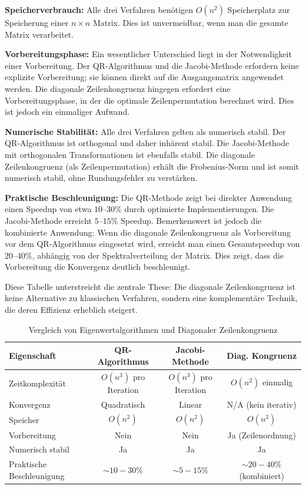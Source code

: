 \documentclass[a4paper,12pt]{article}
\theoremstyle{definition}
\begin{document}
\textbf{Speicherverbrauch:} Alle drei Verfahren benötigen $O(n^2)$ Speicherplatz zur Speicherung einer $n \times n$ Matrix. Dies ist unvermeidbar, wenn man die gesamte Matrix verarbeitet.

\textbf{Vorbereitungsphase:} Ein wesentlicher Unterschied liegt in der Notwendigkeit einer Vorbereitung. Der QR-Algorithmus und die Jacobi-Methode erfordern keine explizite Vorbereitung; sie können direkt auf die Ausgangsmatrix angewendet werden. Die diagonale Zeilenkongruenz hingegen erfordert eine Vorbereitungsphase, in der die optimale Zeilenpermutation berechnet wird. Dies ist jedoch ein einmaliger Aufwand.

\textbf{Numerische Stabilität:} Alle drei Verfahren gelten als numerisch stabil. Der QR-Algorithmus ist orthogonal und daher inhärent stabil. Die Jacobi-Methode mit orthogonalen Transformationen ist ebenfalls stabil. Die diagonale Zeilenkongruenz (als Zeilenpermutation) erhält die Frobenius-Norm und ist somit numerisch stabil, ohne Rundungsfehler zu verstärken.

\textbf{Praktische Beschleunigung:} Die QR-Methode zeigt bei direkter Anwendung einen Speedup von etwa $10$–$30\%$ durch optimierte Implementierungen. Die Jacobi-Methode erreicht $5$–$15\%$ Speedup. Bemerkenswert ist jedoch die kombinierte Anwendung: Wenn die diagonale Zeilenkongruenz als Vorbereitung vor dem QR-Algorithmus eingesetzt wird, erreicht man einen Gesamtspeedup von $20$–$40\%$, abhängig von der Spektralverteilung der Matrix. Dies zeigt, dass die Vorbereitung die Konvergenz deutlich beschleunigt.

Diese Tabelle unterstreicht die zentrale These: Die diagonale Zeilenkongruenz ist keine Alternative zu klassischen Verfahren, sondern eine komplementäre Technik, die deren Effizienz erheblich steigert.

\begin{table}
	\caption{Vergleich von Eigenwertalgorithmen und Diagonaler Zeilenkongruenz}
	\begin{tabular}{l|c|c|c}
		\textbf{Eigenschaft} & \textbf{QR-Algorithmus} & \textbf{Jacobi-Methode} & \textbf{Diag. Kongruenz} \\
		\hline
		Zeitkomplexität & $O(n^3)$ pro Iteration & $O(n^3)$ pro Iteration & $O(n^2)$ einmalig \\
		Konvergenz & Quadratisch & Linear & N/A (kein iterativ) \\
		Speicher & $O(n^2)$ & $O(n^2)$ & $O(n^2)$ \\
		Vorbereitung & Nein & Nein & Ja (Zeilenordnung) \\
		Numerisch stabil & Ja & Ja & Ja \\
		Praktische Beschleunigung & $\sim 10-30\%$ & $\sim 5-15\%$ & $\sim 20-40\%$ (kombiniert)
	\end{tabular}
	\centering
	\label{tab:vergleich-algorithmen}
\end{table}
\end{document}
